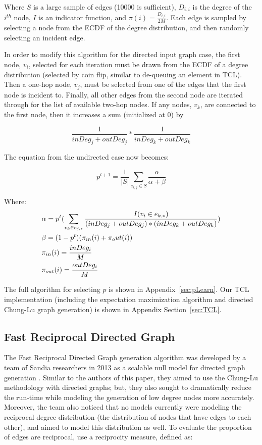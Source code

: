 \documentclass[pdftex,11pt,a4paper,twocolumn]{scrartcl}
\begin{document}
Where $S$ is a large sample of edges (10000 is sufficient), $D_{i,i}$ is the degree of the $i^{th}$ node, $I$ is an indicator function, and $\pi(i) = \frac{D_{i,i}}{2M}$. Each edge is sampled by selecting a node from the ECDF of the degree distribution, and then randomly selecting an incident edge.

In order to modify this algorithm for the directed input graph case, the first node, $v_i$,  selected for each iteration must be drawn from the ECDF of a degree distribution (selected by coin flip, similar to de-queuing an element in TCL). Then a one-hop node, $v_j$, must be selected from one of the edges that the first node is incident to. Finally, all other edges from the second node are iterated through for the list of available two-hop nodes. If any nodes, $v_k$, are connected to the first node, then it increases a sum (initialized at 0) by 

\tiny
$$\frac{1}{inDeg_{j} + outDeg_{j}}*\frac{1}{inDeg_{k} + outDeg_{k}}$$ 
\normalsize

The equation from the undirected case now becomes:

\small
\begin{equation*}
p^{t+1} = \frac{1}{|S|} \sum_{e_{i,j} \in S} \frac{\alpha}{\alpha + \beta }
\end{equation*}
\normalsize

\newpage 

Where: 
\tiny
\begin{align*}
&\alpha = p^t(\sum_{v_k \in e_{j,*}} \frac{I(v_i \in e_{k,*})}{(inDeg_{j} + outDeg_{j})*(inDeg_{k} + outDeg_{k})}) \\
\small
&\beta = (1-p^t)(\pi_{in}(i) + \pi_out(i)) \\
&\pi_{in}(i) = \frac{inDeg_{i}}{M} \\
&\pi_{out}(i) = \frac{outDeg_{i}}{M} \\
\end{align*}

\normalsize

The full algorithm for selecting $p$ is shown in Appendix~\ref{sec:pLearn}. Our TCL implementation (including the expectation maximization algorithm and directed Chung-Lu graph generation) is shown in Appendix Section~\ref{sec:TCL}. 

\subsection{Fast Reciprocal Directed Graph}
The Fast Reciprocal Directed Graph generation algorithm was developed by a team of Sandia researchers in 2013 as a scalable null model for directed graph generation \cite{FRDG}. Similar to the authors of this paper, they aimed to use the Chung-Lu methodology with directed graphs; but, they also sought to dramatically reduce the run-time while modeling the generation of low degree nodes more accurately. Moreover, the team also noticed that no models currently were modeling the reciprocal degree distribution (the distribution of nodes that have edges to each other), and aimed to model this distribution as well. To evaluate the proportion of edges are reciprocal, \cite{FRDG} use a reciprocity measure, defined as:
\end{document}
